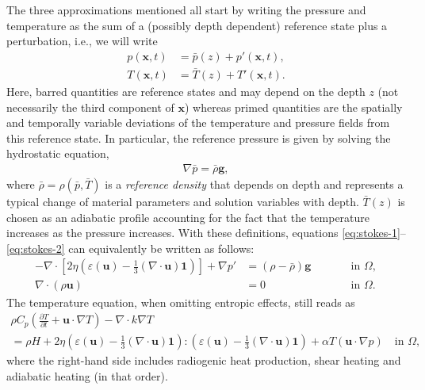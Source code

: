 \documentclass{article}
\begin{document}
The three approximations mentioned all start by writing the pressure and
temperature as the sum of a (possibly depth dependent)
reference state plus a perturbation, i.e., we will write
\begin{align*}
  p(\mathbf x,t) &= \bar p(z) + p'(\mathbf x,t),
  \\
  T(\mathbf x,t) &= \bar T(z) + T'(\mathbf x,t).
\end{align*}
Here, barred quantities are reference states and may depend on the depth $z$
(not necessarily the third component of $\mathbf x$) whereas primed quantities
are the spatially and temporally variable deviations of the temperature and
pressure fields from this reference state. In particular, the reference pressure
is given by solving the hydrostatic equation,
\begin{align}
\label{eq:hydrostatic-pressure}
  \nabla \bar p = \bar\rho \mathbf g,
\end{align}
where $\bar\rho=\rho(\bar p,\bar T)$ is a \textit{reference density} that
depends on depth and represents a typical change of material parameters and solution
variables with depth. $\bar T(z)$ is chosen as an adiabatic profile accounting for the
fact that the temperature increases as the pressure increases.
With these definitions, equations \eqref{eq:stokes-1}--\eqref{eq:stokes-2} can equivalently be written as follows:
\begin{align}
  \label{eq:stokes-decomposed-1}
  -\nabla \cdot \left[2\eta \left(\varepsilon(\mathbf u)
                                  - \frac{1}{3}(\nabla \cdot \mathbf u)\mathbf 1\right)
                \right] + \nabla p' &=
  (\rho-\bar\rho) \mathbf g
  & \qquad
  & \textrm{in $\Omega$},
  \\
  \label{eq:stokes-decomposed-2}
  \nabla \cdot (\rho \mathbf u) &= 0
  & \qquad
  & \textrm{in $\Omega$}.
\end{align}
The temperature equation, when omitting entropic effects, still reads as
\begin{multline}
  \label{eq:temperature-decomposed}
  \rho C_p \left(\frac{\partial T}{\partial t} + \mathbf u\cdot\nabla T\right)
  - \nabla\cdot k\nabla T
  \\
  =
  \rho H
  +
  2\eta
  \left(\varepsilon(\mathbf u) - \frac{1}{3}(\nabla \cdot \mathbf u)\mathbf 1\right)
  :
  \left(\varepsilon(\mathbf u) - \frac{1}{3}(\nabla \cdot \mathbf u)\mathbf 1\right)
  +\alpha T \left( \mathbf u \cdot \nabla p \right)
  \quad
  \textrm{in $\Omega$},
\end{multline}
where the right-hand side includes radiogenic heat production, shear heating and adiabatic heating (in that order).
\end{document}
